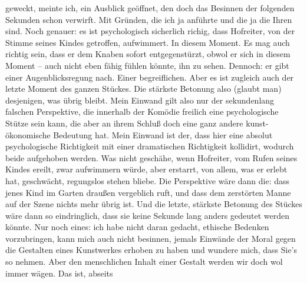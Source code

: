 \begin{ledgroupsized}[t]{13cm}
               geweckt, meinte ich, ein Ausblick geöffnet, den doch das Besinnen der folgenden
               Sekunden schon verwirft. Mit Gründen, die ich ja anführte und die ja die Ihren sind.
               Noch genauer: es ist psychologisch sicherlich richig, dass Hofreiter, von der Stimme seines Kindes
               getroffen, aufwimmert. In diesem Moment. Es mag auch richtig sein, dass er dem Knaben
               sofort entgegenstürzt, obwol er sich in diesem Moment – auch nicht eben fähig fühlen
               könnte, ihn zu sehen. Dennoch: er gibt einer Augenblicksregung nach. Einer
               begreiflichen. Aber es ist zugleich auch der letzte Moment des ganzen Stückes. Die
               stärkste Betonung also (glaubt man) desjenigen, was übrig bleibt. Mein Einwand gilt
               also nur der sekundenlang falschen Perspektive, die innerhalb der Komödie freilich
               eine psychologische Stütze sein kann, die aber an ihrem Schluß doch eine ganz andere
               kunst-ökonomische Bedeutung hat. Mein Einwand ist der, dass hier eine absolut
               psychologische Richtigkeit mit einer dramatischen Richtigkeit kollidirt, wodurch
               beide aufgehoben werden. Was nicht geschähe, wenn Hofreiter, vom Rufen seines Kindes ereilt, zwar aufwimmern
               würde, aber erstarrt, von allem, was er erlebt hat, geschwächt, regungslos stehen
               bliebe. Die Perspektive wäre dann die: dass jenes Kind im Garten draußen vergeblich
               ruft, und dass dem zerstörten Manne auf der Szene nichts mehr übrig ist. Und die
               letzte, stärkste Betonung des Stückes wäre dann so eindringlich, dass sie keine
               Sekunde lang anders gedeutet werden könnte. \pend
           \pstart
           Nur noch eines: ich habe nicht daran gedacht, ethische Bedenken vorzubringen, kann
               mich auch nicht besinnen, jemals Einwände der Moral gegen die Gestalten eines
               Kunstwerkes erhoben zu haben und wundere mich, dass Sie’s so nehmen. Aber den
               menschlichen Inhalt einer Gestalt werden wir doch wol immer wägen. Das ist, abseits

\end{ledgroupsized}
